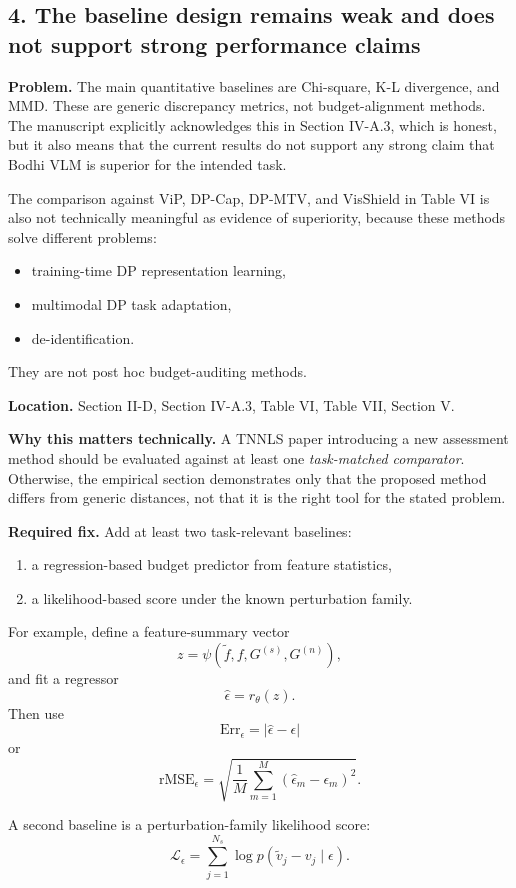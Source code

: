 \subsection*{4. The baseline design remains weak and does not support strong performance claims}

\textbf{Problem.}  
The main quantitative baselines are Chi-square, K-L divergence, and MMD. These are generic discrepancy metrics, not budget-alignment methods. The manuscript explicitly acknowledges this in Section IV-A.3, which is honest, but it also means that the current results do not support any strong claim that Bodhi VLM is superior for the intended task.

The comparison against ViP, DP-Cap, DP-MTV, and VisShield in Table VI is also not technically meaningful as evidence of superiority, because these methods solve different problems:
\begin{itemize}
\item training-time DP representation learning,
\item multimodal DP task adaptation,
\item de-identification.
\end{itemize}
They are not post hoc budget-auditing methods.

\textbf{Location.}  
Section II-D, Section IV-A.3, Table VI, Table VII, Section V.

\textbf{Why this matters technically.}  
A TNNLS paper introducing a new assessment method should be evaluated against at least one \emph{task-matched comparator}. Otherwise, the empirical section demonstrates only that the proposed method differs from generic distances, not that it is the right tool for the stated problem.

\textbf{Required fix.}  
Add at least two task-relevant baselines:
\begin{enumerate}
\item a regression-based budget predictor from feature statistics,
\item a likelihood-based score under the known perturbation family.
\end{enumerate}

For example, define a feature-summary vector
\[
z = \psi(\tilde f, f, G^{(s)}, G^{(n)}),
\]
and fit a regressor
\[
\hat \epsilon = r_\theta(z).
\]
Then use
\[
\mathrm{Err}_\epsilon = |\hat \epsilon - \epsilon|
\]
or
\[
\mathrm{rMSE}_\epsilon
=
\sqrt{
\frac{1}{M}
\sum_{m=1}^{M}
(\hat\epsilon_m-\epsilon_m)^2
}.
\]

A second baseline is a perturbation-family likelihood score:
\[
\mathcal{L}_\epsilon
=
\sum_{j=1}^{N_s}
\log p(\tilde v_j - v_j \mid \epsilon).
\]

